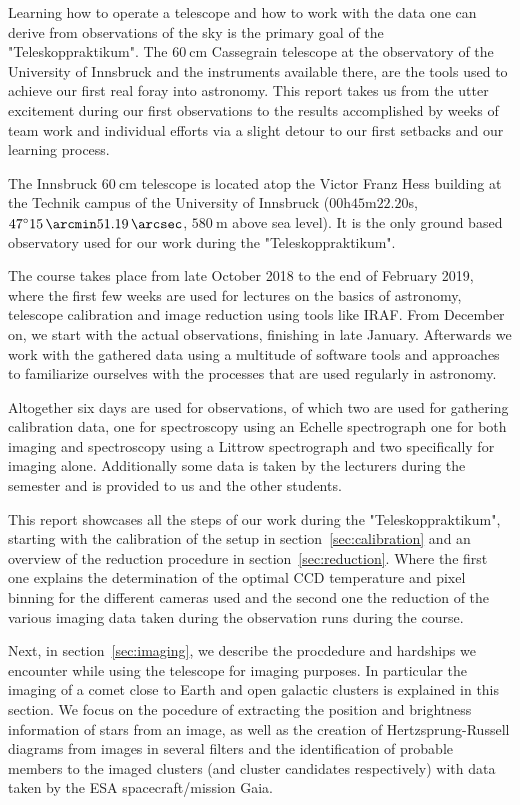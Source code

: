 \documentclass{article}
\begin{document}
Learning how to operate a telescope and how to work with the data one can derive from observations of the sky is the primary goal of the "Teleskoppraktikum". The $\SI{60}{\cm}$ Cassegrain telescope at the observatory of the University of Innsbruck and the instruments available there, are the tools used to achieve our first real foray into astronomy. This report takes us from the utter excitement during our first observations to the results accomplished by weeks of team work and individual efforts via a slight detour to our first setbacks and our learning process. %

The Innsbruck $\SI{60}{\cm}$ telescope is located  atop the Victor Franz Hess building at the Technik campus of the University of Innsbruck ($00$h$45$m$22.20$s, $\SI{47}{\degree} \SI{15}{\arcmin}\SI{51.19}{\arcsec}$, $\SI{580}{\m}$ above sea level). It is the only ground based observatory used for our work during the "Teleskoppraktikum".

The course takes place from late October 2018 to the end of February 2019, where the first few weeks are used for lectures on the basics of astronomy, telescope calibration and image reduction using tools like IRAF. From December on, we start with the actual observations, finishing in late January. Afterwards we work with the gathered data using a multitude of software tools and approaches to familiarize ourselves with the processes that are used regularly in astronomy.

Altogether six days are used for observations, of which two are used for gathering calibration data, one for spectroscopy using an Echelle spectrograph one for both imaging and spectroscopy using a Littrow spectrograph and two specifically for imaging alone. Additionally some data is taken by the lecturers during the semester and is provided to us and the other students. 

This report showcases all the steps of our work during the "Teleskoppraktikum", starting with the calibration of the setup in section~\ref{sec:calibration} and an overview of the reduction procedure in section~\ref{sec:reduction}. Where the first one explains the determination of the optimal CCD temperature and pixel binning for the different cameras used and the second one the reduction of the various imaging data taken during the observation runs during the course. 

Next, in section~\ref{sec:imaging}, we describe the procdedure and hardships we encounter while using the telescope for imaging purposes. In particular the imaging of a comet close to Earth and open galactic clusters is explained in this section. We focus on the pocedure of extracting the position and brightness information of stars from an image, as well as the creation of Hertzsprung-Russell diagrams from images in several filters and the identification of probable members to the imaged clusters (and cluster candidates respectively) with data taken by the ESA spacecraft/mission Gaia. 
\end{document}
